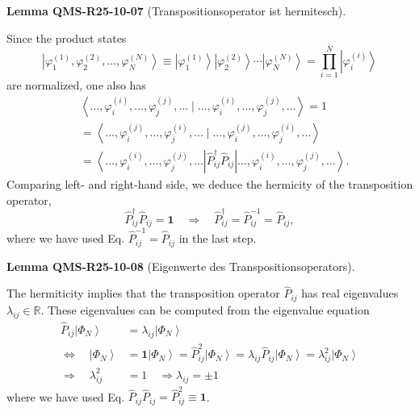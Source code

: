 \documentclass[10pt, letterpaper]{article}
\newcommand{\CustomHeading}[3]{%
  \par\medskip\noindent%
  \textbf{#1 #2} \textnormal{(#3)}.\enskip%
}
\newenvironment{LEM}[2]{\begin{unitbox}\CustomHeading{Lemma}{#1}{#2}}{\end{unitbox}}
\begin{document}
\begin{LEM}{QMS-R25-10-07}{Transpositionsoperator ist hermitesch}
Since the product states
$$\left|\varphi_1^{(1)}, \varphi_2^{(2)}, \ldots, \varphi_N^{(N)}\right\rangle \equiv\left|\varphi_1^{(1)}\right\rangle\left|\varphi_2^{(2)}\right\rangle \cdots\left|\varphi_N^{(N)}\right\rangle=\prod_{i=1}^N\left|\varphi_i^{(i)}\right\rangle$$
are normalized, one also has
$$
\begin{aligned}
& \left\langle\ldots, \varphi_{i}^{(i)}, \ldots, \varphi_{j}^{(j)}, \ldots \mid \ldots, \varphi_{i}^{(i)}, \ldots, \varphi_{j}^{(j)}, \ldots\right\rangle=1 \\
& =\left\langle\ldots, \varphi_{i}^{(j)}, \ldots, \varphi_{j}^{(i)}, \ldots \mid \ldots, \varphi_{i}^{(j)}, \ldots, \varphi_{j}^{(i)}, \ldots\right\rangle \\
& =\left\langle\ldots, \varphi_{i}^{(i)}, \ldots, \varphi_{j}^{(j)}, \ldots\right| \hat{P}_{i j}^{\dagger} \hat{P}_{i j}\left|\ldots, \varphi_{i}^{(i)}, \ldots, \varphi_{j}^{(j)}, \ldots\right\rangle .
\end{aligned}
$$
Comparing left- and right-hand side, we deduce the hermicity of the transposition operator,
$$
\hat{P}_{i j}^{\dagger} \hat{P}_{i j}=\mathbf{1} \quad \Longrightarrow \quad \hat{P}_{i j}^{\dagger}=\hat{P}_{i j}^{-1}=\hat{P}_{i j},
$$
where we have used Eq. $\hat{P}_{i j}^{-1}=\hat{P}_{i j}$ in the last step.
\end{LEM}


\begin{LEM}{QMS-R25-10-08}{Eigenwerte des Transpositionsoperators}
The hermiticity implies that the transposition operator $\hat{P}_{i j}$ has real eigenvalues $\lambda_{i j} \in \mathbb{R}$. These eigenvalues can be computed from the eigenvalue equation
$$
\begin{aligned}
\hat{P}_{i j}\left|\Phi_{N}\right\rangle & =\lambda_{i j}\left|\Phi_{N}\right\rangle \\
\Longleftrightarrow \quad\left|\Phi_{N}\right\rangle & =\mathbf{1}\left|\Phi_{N}\right\rangle=\hat{P}_{i j}^{2}\left|\Phi_{N}\right\rangle=\lambda_{i j} \hat{P}_{i j}\left|\Phi_{N}\right\rangle=\lambda_{i j}^{2}\left|\Phi_{N}\right\rangle \\
\Longrightarrow \quad \lambda_{i j}^{2} & =1 \quad \Longrightarrow \lambda_{i j}= \pm 1
\end{aligned}
$$
where we have used Eq. $\hat{P}_{i j} \hat{P}_{i j}=\hat{P}_{i j}^2 \equiv \mathbf{1}$.
\end{LEM}
\end{document}
